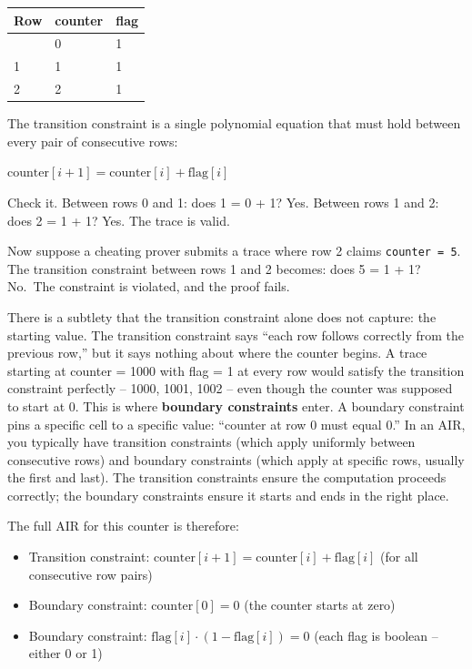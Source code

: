 \documentclass[
  11pt,
  openany]{report}
\providecommand{\tightlist}{%
  \setlength{\itemsep}{0pt}\setlength{\parskip}{0pt}}
\renewcommand{\textbf}[1]{{\bfseries\color{MidnightBold}#1}}
\begin{document}
\begin{longtable}[]{@{}lll@{}}
\toprule\noalign{}
Row & counter & flag \\
\midrule\noalign{}
\arrayrulecolor{MidnightBlue}\midrule\arrayrulecolor{MidnightBorder}
\endhead
\bottomrule\noalign{}
\endlastfoot
0 & 0 & 1 \\
1 & 1 & 1 \\
2 & 2 & 1 \\
\end{longtable}

The transition constraint is a single polynomial equation that must hold between
every pair of consecutive rows:

\(\text{counter}[i+1] = \text{counter}[i] + \text{flag}[i]\)

Check it. Between rows 0 and 1: does 1 = 0 + 1? Yes. Between rows 1 and 2: does
2 = 1 + 1? Yes. The trace is valid.

Now suppose a cheating prover submits a trace where row 2 claims
\texttt{counter\ =\ 5}. The transition constraint between rows 1 and 2 becomes:
does 5 = 1 + 1? No.~The constraint is violated, and the proof fails.

There is a subtlety that the transition constraint alone does not capture: the
starting value. The transition constraint says ``each row follows correctly from
the previous row,'' but it says nothing about where the counter begins. A trace
starting at counter = 1000 with flag = 1 at every row would satisfy the
transition constraint perfectly -- 1000, 1001, 1002 -- even though the counter
was supposed to start at 0. This is where \textbf{boundary constraints} enter. A
boundary constraint pins a specific cell to a specific value: ``counter at row 0
must equal 0.'' In an AIR, you typically have transition constraints (which
apply uniformly between consecutive rows) and boundary constraints (which apply
at specific rows, usually the first and last). The transition constraints ensure
the computation proceeds correctly; the boundary constraints ensure it starts
and ends in the right place.

The full AIR for this counter is therefore:

\begin{itemize}
\tightlist
\item
  Transition constraint:
  \(\text{counter}[i+1] = \text{counter}[i] + \text{flag}[i]\) (for all
  consecutive row pairs)
\item
  Boundary constraint: \(\text{counter}[0] = 0\) (the counter starts at zero)
\item
  Boundary constraint: \(\text{flag}[i] \cdot (1 - \text{flag}[i]) = 0\) (each
  flag is boolean -- either 0 or 1)
\end{itemize}
\end{document}
